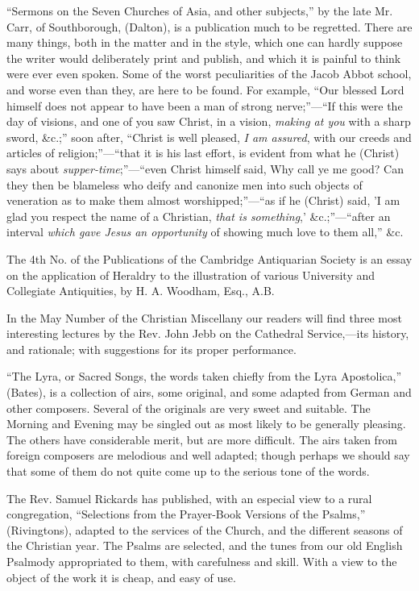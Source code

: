 ``Sermons on the Seven Churches of Asia, and other
subjects,'' by the late Mr. Carr, of Southborough, (Dalton), is a
publication much to be regretted. There are many things, both in the
matter and in the style, which one can hardly suppose the writer would
deliberately print and publish, and which it is painful to think were
ever even spoken. Some of the worst peculiarities of the Jacob Abbot
school, and worse even than they, are here to be found. For example, ``Our
blessed Lord himself does not appear to have been a man of strong nerve;''—``If
this were the day of visions, and one of you saw Christ, in a vision, \emph{making
at you} with a sharp sword, \&c.;'' soon after, ``Christ is well
pleased, \emph{I am assured}, with our creeds and articles of religion;''—``that
it is his last effort, is evident from what he (Christ) says about \emph{supper-time};''—``even
Christ himself said, Why call ye me good? Can they then be blameless who
deify and canonize men into such objects of veneration as to make them
almost worshipped;''—``as if he (Christ) said, 'I am glad you respect
the name of a Christian, \emph{that is something},' \&c.;''—``after
an interval \emph{which gave Jesus an opportunity} of showing much love
to them all,'' \&c.

The 4th No. of the Publications of the Cambridge
Antiquarian Society is an essay on the application of Heraldry to the
illustration of various University and Collegiate Antiquities, by H. A.
Woodham, Esq., A.B.

In the May Number of the Christian Miscellany our
readers will find three most interesting lectures by the Rev. John Jebb
on the Cathedral Service,—its history, and rationale; with suggestions
for its proper performance.

``The Lyra, or Sacred Songs, the words taken chiefly
from the Lyra Apostolica,'' (Bates), is a collection of airs, some
original, and some adapted from German and other composers. Several of
the originals are very sweet and suitable. The Morning and Evening may
be singled out as most likely to be generally pleasing. The others have
considerable merit, but are more difficult. The airs taken from foreign
composers are melodious and well adapted; though perhaps we should say
that some of them do not quite come up to the serious tone of the words.

The Rev. Samuel Rickards has published, with an
especial view to a rural congregation, ``Selections from the Prayer-Book
Versions of the Psalms,'' (Rivingtons), adapted to the services of the
Church, and the different seasons of the Christian year. The Psalms are
selected, and the tunes from our old English Psalmody appropriated to
them, with carefulness and skill. With a view to the object of the work
it is cheap, and easy of use.


